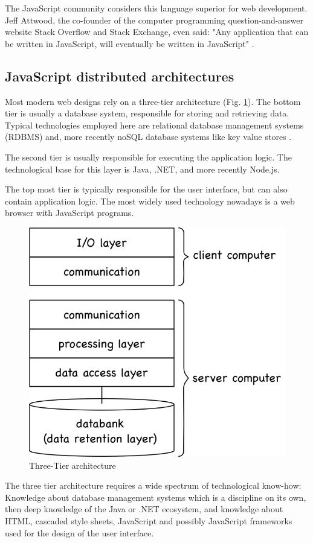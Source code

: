 The JavaScript community considers this language superior for web development. Jeff Attwood, the co-founder of 
the  computer programming question-and-answer website Stack Overflow and Stack Exchange, even said: 
"Any application that can be written in JavaScript, will eventually be written in JavaScript" \cite{Louis2018Java}.
 
\subsection{JavaScript distributed architectures}

Most modern web designs rely on a three-tier architecture (Fig. 
\ref{fig:TT}). The bottom tier is usually a database system, responsible for storing and retrieving data. Typical 
technologies employed here are relational database management systems (RDBMS) and, more recently noSQL database systems like key value stores \cite{GOLL}. 

The second tier is usually responsible for executing the application logic.
The technological base for this layer is Java, .NET, and more recently Node.js.
 
The top most tier is typically responsible for the user interface, but can also contain application logic.
The most widely used technology nowadays is a web browser with JavaScript programs. 

\begin{figure}[H]
	\centering
	\includegraphics[width=0.5\linewidth]{bilder/grundlagen/Three-Tier.png}
	\caption{Three-Tier architecture \cite{GOLL}}
	\label{fig:TT}
\end{figure}

The three tier architecture requires a wide spectrum of technological know-how:
Know\-ledge about database management systems which is a discipline on its own,
then deep knowledge of the Java or  .NET ecosystem, and knowledge about HTML, 
cascaded style sheets, JavaScript 
and possibly JavaScript frameworks used for the design of the user interface.

